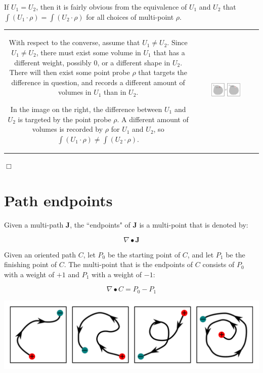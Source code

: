 If \(U_1 = U_2\), then it is fairly obvious from the equivalence of \(U_1\) and \(U_2\) that \(\int (U_1 \cdot \rho) = \int (U_2 \cdot \rho)\) for all choices of multi-point \(\rho\). 

\vspace{5mm}

\begin{tabular}{cc}
\parbox{0.5\textwidth}{
With respect to the converse, assume that \(U_1 \neq U_2\). Since \(U_1 \neq U_2\), there must exist some volume in \(U_1\) that has a different weight, possibly \(0\), or a different shape in \(U_2\). There will then exist some point probe \(\rho\) that targets the difference in question, and records a different amount of volumes in \(U_1\) than in \(U_2\).

In the image on the right, the difference between \(U_1\) and \(U_2\) is targeted by the point probe \(\rho\). A different amount of volumes is recorded by \(\rho\) for \(U_1\) and \(U_2\), so \(\int (U_1 \cdot \rho) \neq \int (U_2 \cdot \rho)\).
} & \parbox{0.5\textwidth}{
\includegraphics[width = 0.5\textwidth]{Point_totals/scanning_volumes_using_points}
}
\end{tabular}

\(\Box\)





\section{Path endpoints}

Given a multi-path \(\mathbf{J}\), the ``endpoints" of \(\mathbf{J}\) is a multi-point that is denoted by:

\[\nabla \bullet \mathbf{J}\]

Given an oriented path \(C\), let \(P_0\) be the starting point of \(C\), and let \(P_1\) be the finishing point of \(C\). The multi-point that is the endpoints of \(C\) consists of \(P_0\) with a weight of \(+1\) and \(P_1\) with a weight of \(-1\):

\[\nabla \bullet C = P_0 - P_1\]

\begin{center}
\includegraphics[width = \textwidth]{Boundaries/Path_endpoints/path_endpoint_examples}
\end{center}

